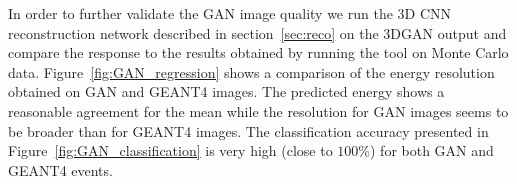 In order to further validate the GAN image quality we run the 3D CNN reconstruction network described in section~\ref{sec:reco} on the 3DGAN output and compare the response to the results obtained by running the tool on Monte Carlo data. Figure~\ref{fig:GAN_regression} shows a comparison of the energy resolution obtained on GAN and GEANT4 images. The predicted energy shows a reasonable agreement for the mean while the resolution for GAN images seems to be broader than for GEANT4 images. The classification accuracy presented in Figure~\ref{fig:GAN_classification} is very high (close to $100\%$) for both GAN and GEANT4 events. 